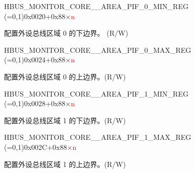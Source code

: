 \begin{register}{H}{BUS\_MONITOR\_CORE\_\_AREA\_PIF\_0\_MIN\_REG (=0,1)}{0x0020+0x88×\textcolor{red}{n}}\label{regdesc:BUSMONITORCORE0AREAPIF0MINREG}
%
\regnewline%
\begin{regdesc}\begin{reglist}
\label{fielddesc:BUSMONITORCORE0AREAPIF0MIN}\item [BUS\_MONITOR\_CORE\_\regindex{n}\_AREA\_PIF\_0\_MIN] 配置外设总线区域 0 的下边界。 (R/W)
\end{reglist}\end{regdesc}
\end{register}


\begin{register}{H}{BUS\_MONITOR\_CORE\_\_AREA\_PIF\_0\_MAX\_REG (=0,1)}{0x0024+0x88×\textcolor{red}{n}}\label{regdesc:BUSMONITORCORE0AREAPIF0MAXREG}
%
\regnewline%
\begin{regdesc}\begin{reglist}
\label{fielddesc:BUSMONITORCORE0AREAPIF0MAX}\item [BUS\_MONITOR\_CORE\_\regindex{n}\_AREA\_PIF\_0\_MAX] 配置外设总线区域 0 的上边界。(R/W)
\end{reglist}\end{regdesc}
\end{register}


\begin{register}{H}{BUS\_MONITOR\_CORE\_\_AREA\_PIF\_1\_MIN\_REG (=0,1)}{0x0028+0x88×\textcolor{red}{n}}\label{regdesc:BUSMONITORCORE0AREAPIF1MINREG}
%
\regnewline%
\begin{regdesc}\begin{reglist}
\label{fielddesc:BUSMONITORCORE0AREAPIF1MIN}\item [BUS\_MONITOR\_CORE\_\regindex{n}\_AREA\_PIF\_1\_MIN] 配置外设总线区域 1 的下边界。(R/W)
\end{reglist}\end{regdesc}
\end{register}


\begin{register}{H}{BUS\_MONITOR\_CORE\_\_AREA\_PIF\_1\_MAX\_REG (=0,1)}{0x002C+0x88×\textcolor{red}{n}}\label{regdesc:BUSMONITORCORE0AREAPIF1MAXREG}
%
\regnewline%
\begin{regdesc}\begin{reglist}
\label{fielddesc:BUSMONITORCORE0AREAPIF1MAX}\item [BUS\_MONITOR\_CORE\_\regindex{n}\_AREA\_PIF\_1\_MAX] 配置外设总线区域 1 的上边界。(R/W)
\end{reglist}\end{regdesc}
\end{register}



